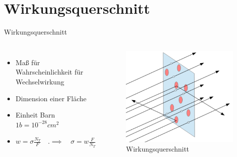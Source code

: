 \documentclass[aspectratio=169,xcolor=dvipsnames]{beamer}
\begin{document}
\section{Wirkungsquerschnitt}
\begin{frame}{Wirkungsquerschnitt}
    \begin{columns}[c]
        \begin{itemize}
            \item Maß für Wahrscheinlichkeit für Wechselwirkung
            \item Dimension einer Fläche
            \item Einheit Barn $1b = 10^{-28}cm^2$
            \item $w=\sigma \frac{N_T}{F}\quad. \implies \quad \sigma=w\frac{F}{N_T}$
        \end{itemize}

        \begin{figure}
            \centering
            \includegraphics[width=1\linewidth]{figures/Wirkungsquerschnitt.png}
            \caption{Wirkungsquerschnitt}
            \label{fig:Wirkungsquerschnitt}
        \end{figure}
    \end{columns}
\end{frame}
\end{document}

